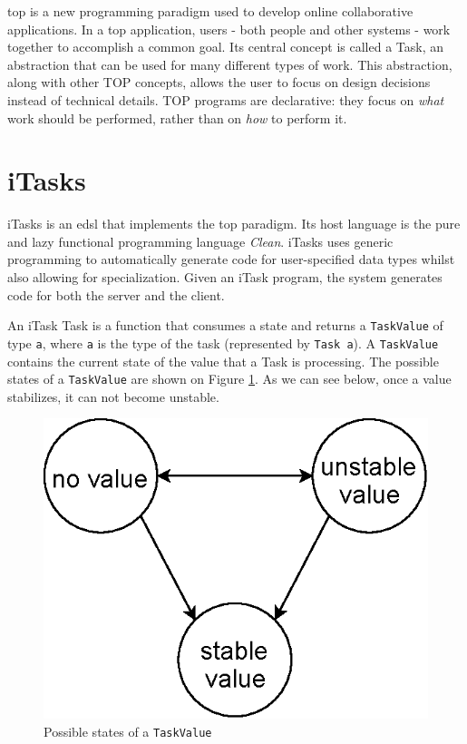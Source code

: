 \acf{top} is a new programming paradigm used to develop online collaborative applications. In a \acs{top} application, users - both people and other systems - work together to accomplish a common goal. Its central concept is called a Task, an abstraction that can be used for many different types of work. This abstraction, along with other TOP concepts, allows the user to focus on design decisions instead of technical details. TOP programs are declarative: they focus on \textit{what} work should be performed, rather than on \textit{how} to perform it.

\section{iTasks}\label{itasks}
iTasks is an \acs{edsl} that implements the \acs{top} paradigm. Its host language is the pure and lazy functional programming language \textit{Clean}. iTasks uses generic programming to automatically generate code for user-specified data types whilst also allowing for specialization. Given an iTask program, the system generates code for both the server and the client.

An iTask Task is a function that consumes a state and returns a \texttt{TaskValue} of type \texttt{a}, where \texttt{a} is the type of the task (represented by \texttt{Task a}). A \texttt{TaskValue} contains the current state of the value that a Task is processing. The possible states of a \texttt{TaskValue} are shown on Figure \ref{fig:task_value}. As we can see below, once a value stabilizes, it can not become unstable.


\begin{figure}[H]
\begin{center}
\includegraphics[scale=0.7]{thesis/img/task_value.eps}
\end{center}
\caption{Possible states of a \texttt{TaskValue}}
\label{fig:task_value}
\end{figure}

